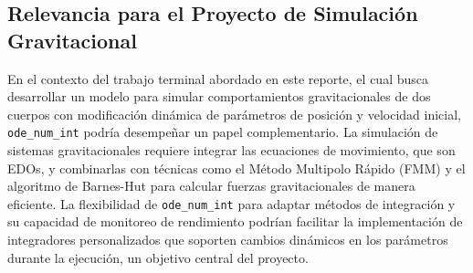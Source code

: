 \subsection{Relevancia para el Proyecto de Simulación Gravitacional}

En el contexto del trabajo terminal abordado en este reporte, el cual busca desarrollar un modelo para simular comportamientos gravitacionales de dos cuerpos con modificación dinámica de parámetros de posición y velocidad inicial, \texttt{ode\_num\_int} podría desempeñar un papel complementario. La simulación de sistemas gravitacionales requiere integrar las ecuaciones de movimiento, que son EDOs, y combinarlas con técnicas como el Método Multipolo Rápido (FMM) y el algoritmo de Barnes-Hut para calcular fuerzas gravitacionales de manera eficiente. La flexibilidad de \texttt{ode\_num\_int} para adaptar métodos de integración y su capacidad de monitoreo de rendimiento podrían facilitar la implementación de integradores personalizados que soporten cambios dinámicos en los parámetros durante la ejecución, un objetivo central del proyecto.


